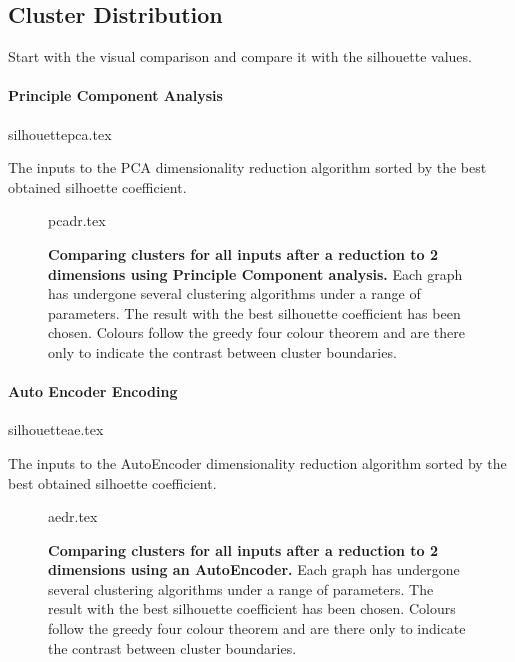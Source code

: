 \subsection{Cluster Distribution}\label{sec:cldist}

Start with the visual comparison and compare it with the silhouette values.




\paragraph*{Principle Component Analysis}


\begin{table}[H]
    \centering
        {silhouettepca.tex}
        \caption{The inputs to the PCA dimensionality reduction algorithm sorted by the best obtained silhoette coefficient.  }
        \label{tab:pcasil}
\end{table}



\begin{landscape}
\begin{figure}[H]
    {pcadr.tex}
    \caption{\textbf{Comparing clusters for all inputs after a reduction to 2 dimensions using Principle Component analysis.}
    Each graph has undergone several clustering algorithms under a range of parameters. The result with the best silhouette coefficient has been chosen. Colours follow the greedy four colour theorem and are there only to indicate the contrast between cluster boundaries.}
    \label{fig:pcavis}
\end{figure}
\end{landscape}






\paragraph*{Auto Encoder Encoding}

\begin{table}[H]
    \centering
        {silhouetteae.tex}
        \caption{The inputs to the AutoEncoder dimensionality reduction algorithm sorted by the best obtained silhoette coefficient.  }
        \label{tab:aesil}
\end{table}





\begin{landscape}
\begin{figure}[H]
    {aedr.tex}
    \caption{\textbf{Comparing clusters for all inputs after a reduction to 2 dimensions using an AutoEncoder.}
    Each graph has undergone several clustering algorithms under a range of parameters. The result with the best silhouette coefficient has been chosen. Colours follow the greedy four colour theorem and are there only to indicate the contrast between cluster boundaries.}
    \label{fig:aevis}
\end{figure}
\end{landscape}




